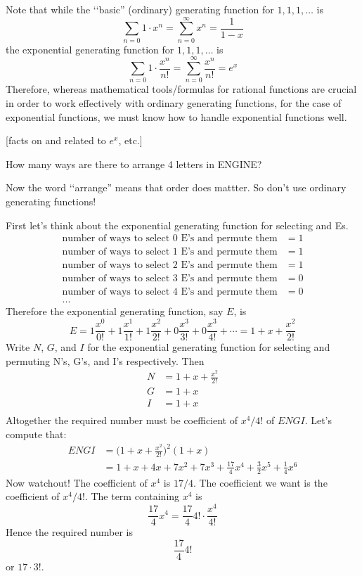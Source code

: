 Note that while the \lq\lq basic'' (ordinary) generating function 
for $1, 1, 1, \ldots$ is
\[
\sum_{n=0} 1 \cdot x^n = \sum_{n=0}^\infty x^n = \frac{1}{1-x}
\]
the exponential generating function for $1, 1, 1, \ldots$ is
\[
\sum_{n=0} 1 \cdot \frac{x^n}{n!} = 
\sum_{n=0}^\infty \frac{x^n}{n!} = e^x
\]
Therefore, whereas mathematical tools/formulas for rational functions 
are crucial in order to work effectively with ordinary generating functions,
for the case of 
exponential functions, we must know how to handle 
exponential functions well. 

[facts on and related to $e^x$, etc.]

\begin{eg}
How many ways are there to arrange 4 letters in ENGINE?
\end{eg}

Now the word \lq\lq arrange'' means that order does mattter.
So don't use ordinary generating functions!

First let's think about the exponential generating function for 
selecting and Es. 
\begin{align*}
\text{number of ways to select 0 E's and permute them} &= 1 \\
\text{number of ways to select 1 E's and permute them} &= 1 \\
\text{number of ways to select 2 E's and permute them} &= 1 \\
\text{number of ways to select 3 E's and permute them} &= 0 \\
\text{number of ways to select 4 E's and permute them} &= 0 \\
... &
\end{align*}
Therefore the exponential generating function, say $E$, is
\[
E = 
1 \frac{x^0}{0!} +
1 \frac{x^1}{1!} +
1 \frac{x^2}{2!} +
0 \frac{x^3}{3!} +
0 \frac{x^3}{4!} +
\cdots
= 1 + x + \frac{x^2}{2!}
\]
Write $N$, $G$, and $I$
for the exponential generating function for selecting
and permuting N's, G's, and I's respectively.
Then
\begin{align*}
N &= 1 + x + \frac{x^2}{2!}\\
G &= 1 + x \\
I &= 1 + x\\
\end{align*}
Altogether the required number must be coefficient of $x^4/4!$
of $ENGI$.
Let's compute that:
\begin{align*}
ENGI
&= 
\biggl( 1 + x + \frac{x^2}{2!} \biggr)^2
(1+x) \\
&= 1 + x + 4x + 7x^2 + 7x^3 + \frac{17}{4}x^4
+ \frac{3}{2}x^5
+ \frac{1}{4}x^6
\end{align*}
Now watchout! 
The coefficient of $x^4$ is $17/4$.
The coefficient we want is the coefficient of 
$x^4/4!$.
The term containing $x^4$ is
\[
\frac{17}{4} x^4 =
\frac{17}{4} 4! \cdot \frac{x^4}{4!}
\]
Hence the required number is
\[
\frac{17}{4} 4!
\]
or $17 \cdot 3!$.




